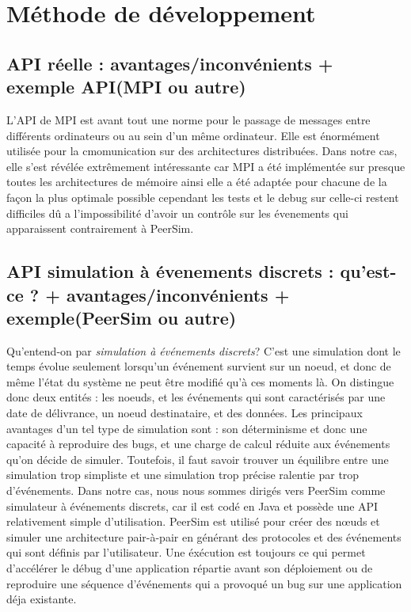 \documentclass{article}
\begin{document}
		\section{Méthode de développement}
			\subsection{API réelle : avantages/inconvénients + exemple API(MPI ou autre)}
			L'API de MPI est avant tout une norme pour le passage de messages entre différents ordinateurs ou au sein d'un même ordinateur.
			Elle est énormément utilisée pour la cmomunication sur des architectures distribuées.
			Dans notre cas, elle s'est révélée extrêmement intéressante car MPI a été implémentée sur presque toutes les architectures de mémoire ainsi elle 
			a été adaptée pour chacune de la façon la plus optimale possible cependant les tests et le debug sur celle-ci restent difficiles dû a l'impossibilité 
			d'avoir un contrôle sur les évenements qui apparaissent contrairement à PeerSim.
			\newpage
			\subsection{API simulation à évenements discrets : qu'est-ce ? + avantages/inconvénients + exemple(PeerSim ou autre)}
				Qu'entend-on par \textit{simulation à événements discrets}? C'est une simulation dont le temps évolue seulement lorsqu'un événement survient sur un noeud, et donc de même l'état du système ne peut être modifié qu'à ces moments là.
\newline \indent On distingue donc deux entités : les noeuds, et les événements qui sont caractérisés par une date de délivrance, un noeud destinataire, et des données.
\newline \indent Les principaux avantages d'un tel type de simulation sont : son déterminisme et donc une capacité à reproduire des bugs, et une charge de calcul réduite aux événements qu'on décide de simuler. Toutefois, il faut savoir trouver un équilibre entre une simulation trop simpliste et une simulation trop précise ralentie par trop d'événements.
\newline \indent Dans notre cas, nous nous sommes dirigés vers PeerSim comme simulateur à événements discrets, car il est codé en Java et possède une API relativement simple d'utilisation.
\newline \indent PeerSim est utilisé pour créer des nœuds et simuler une architecture pair-à-pair en générant des protocoles et des événements qui sont définis par l'utilisateur. Une éxécution est toujours ce qui permet d'accélérer le débug d'une application répartie avant son déploiement ou de reproduire une séquence d'événements qui a provoqué un bug sur une application déja existante.
\end{document}
